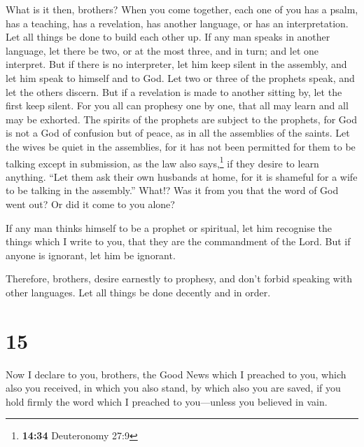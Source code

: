  What is it then, brothers? When you come together, each
one of you has a psalm, has a teaching, has a revelation, has another
language, or has an interpretation. Let all things be done to build each
other up.  If any man speaks in another language, let
there be two, or at the most three, and in turn; and let one interpret.
 But if there is no interpreter, let him keep silent in
the assembly, and let him speak to himself and to God. 
Let two or three of the prophets speak, and let the others discern.
 But if a revelation is made to another sitting by, let
the first keep silent.  For you all can prophesy one by
one, that all may learn and all may be exhorted.  The
spirits of the prophets are subject to the prophets,  for
God is not a God of confusion but of peace, as in all the assemblies of
the saints.  Let the wives be quiet in the assemblies,
for it has not been permitted for them to be talking except in
submission, as the law also says,\footnote{\textbf{14:34} Deuteronomy
  27:9}  if they desire to learn anything. ``Let them ask
their own husbands at home, for it is shameful for a wife to be talking
in the assembly.''  What!? Was it from you that the word
of God went out? Or did it come to you alone?

 If any man thinks himself to be a prophet or spiritual,
let him recognise the things which I write to you, that they are the
commandment of the Lord.  But if anyone is ignorant, let
him be ignorant.

 Therefore, brothers, desire earnestly to prophesy, and
don't forbid speaking with other languages.  Let all
things be done decently and in order.

\hypertarget{section-14}{%
\section{15}\label{section-14}}

 Now I declare to you, brothers, the Good News which I
preached to you, which also you received, in which you also stand,
 by which also you are saved, if you hold firmly the word
which I preached to you---unless you believed in vain.

